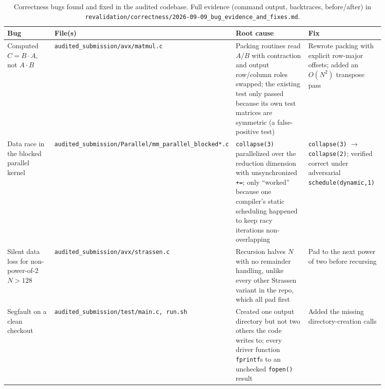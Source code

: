 \documentclass[acmsmall]{acmart}
\begin{document}
\begin{table}[h]
\centering
\small
\caption{Correctness bugs found and fixed in the audited codebase. Full
evidence (command output, backtraces, before/after) in
\texttt{revalidation/correctness/2026-09-09\_bug\_evidence\_and\_fixes.md}.}
\label{tab:bugs}
\begin{tabular}{p{0.18\linewidth}p{0.19\linewidth}p{0.31\linewidth}p{0.22\linewidth}}
\toprule
Bug & File(s) & Root cause & Fix \\
\midrule
Computed $C{=}B{\cdot}A$, not $A{\cdot}B$ &
  \texttt{\scriptsize audited\_submission/\allowbreak avx/\allowbreak matmul.c} &
  Packing routines read $A$/$B$ with contraction and output row/column
  roles swapped; the existing test only passed because its own test
  matrices are symmetric (a false-positive test) &
  Rewrote packing with explicit row-major offsets; added an $O(N^2)$
  transpose pass \\
Data race in the blocked parallel kernel &
  \texttt{\scriptsize audited\_submission/\allowbreak Parallel/\allowbreak mm\_\allowbreak parallel\_\allowbreak blocked*.c} &
  \texttt{collapse(3)} parallelized over the reduction dimension with
  unsynchronized \texttt{+=}; only ``worked'' because one compiler's
  static scheduling happened to keep racy iterations non-overlapping &
  \texttt{collapse(3)} $\to$ \texttt{collapse(2)}; verified correct
  under adversarial \texttt{schedule(dynamic,1)} \\
Silent data loss for non-power-of-2 $N{>}128$ &
  \texttt{\scriptsize audited\_submission/\allowbreak avx/\allowbreak strassen.c} &
  Recursion halves $N$ with no remainder handling, unlike every other
  Strassen variant in the repo, which all pad first &
  Pad to the next power of two before recursing \\
Segfault on a clean checkout &
  \texttt{\scriptsize audited\_submission/\allowbreak test/\allowbreak main.c,
  \allowbreak run.sh} &
  Created one output directory but not two others the code writes to;
  every driver function \texttt{fprintf}s to an unchecked
  \texttt{fopen()} result &
  Added the missing directory-creation calls \\
\bottomrule
\end{tabular}
\end{table}
\end{document}
